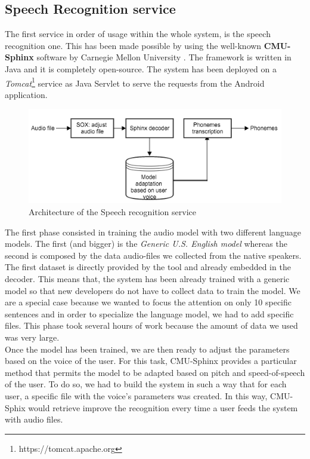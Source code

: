\subsection{Speech Recognition service}
\label{ssec:training_sr_model}

The first service in order of usage within the whole system, is the speech recognition one. This has been made possible by using the well-known \textbf{CMU-Sphinx} software by Carnegie Mellon University \cite{walker2004sphinx}. The framework is written in Java and it is completely open-source. The system has been deployed on a \textit{Tomcat}\footnote{https://tomcat.apache.org} service as Java Servlet to serve the requests from the Android application. \\

\begin{figure}[!ht]
	\centering
	\includegraphics[scale=0.6]{Figures/sphinx_service.png}
	\caption{Architecture of the Speech recognition service}
	\label{fig:sphinx_service}
\end{figure}

\noindent The first phase consisted in training the audio model with two different language models. The first (and bigger) is the \textit{Generic U.S. English model} whereas the second is composed by the data audio-files we collected from the native speakers. The first dataset is directly provided by the tool and already embedded in the decoder. This means that, the system has been already trained with a generic model so that new developers do not have to collect data to train the model. We are a special case because we wanted to focus the attention on only 10 specific sentences and in order to specialize the language model, we had to add specific files. This phase took several hours of work because the amount of data we used was very large. \\

\noindent Once the model has been trained, we are then ready to adjust the parameters based on the voice of the user. For this task, CMU-Sphinx provides a particular method that permits the model to be adapted based on pitch and speed-of-speech of the user. To do so, we had to build the system in such a way that for each user, a specific file with the voice's parameters was created. In this way, CMU-Sphix would retrieve improve the recognition every time a user feeds the system with audio files. \\


